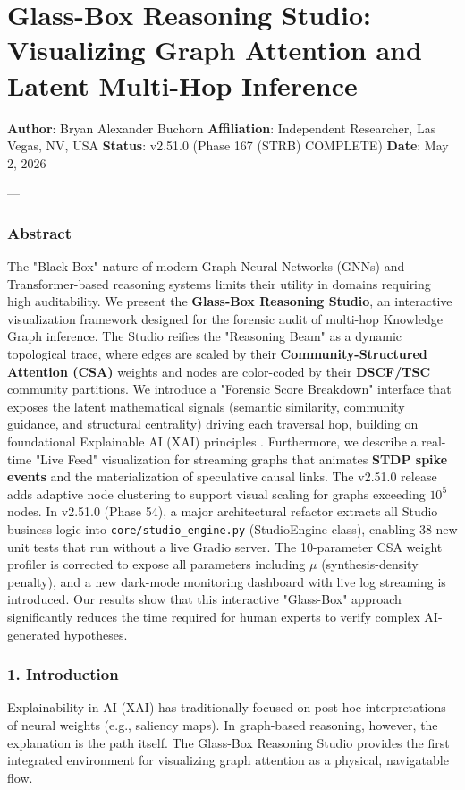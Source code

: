\section{Glass-Box Reasoning Studio: Visualizing Graph Attention and Latent Multi-Hop Inference}

\textbf{Author}: Bryan Alexander Buchorn  
\textbf{Affiliation}: Independent Researcher, Las Vegas, NV, USA  
\textbf{Status}: v2.51.0 (Phase 167 (STRB) COMPLETE)
\textbf{Date}: May 2, 2026

---

\subsubsection{Abstract}
The "Black-Box" nature of modern Graph Neural Networks (GNNs) and Transformer-based reasoning systems limits their utility in domains requiring high audit\-ability. We present the \textbf{Glass-Box Reasoning Studio}, an interactive visua\-lization framework designed for the forensic audit of multi-hop Knowledge Graph inference. The Studio reifies the "Reasoning Beam" as a dynamic topological trace, where edges are scaled by their \textbf{Community-Structured Attention (CSA)} weights and nodes are color-coded by their \textbf{DSCF/TSC} community partitions. We introduce a "Forensic Score Breakdown" interface that exposes the latent mathe\-matical signals (semantic similarity, community guidance, and structural centrality) driving each traversal hop, building on found\-ational Explainable AI (XAI) principles \cite{samek2017explainable, ribeiro2016lime, lundberg2017shap}. Furthermore, we describe a real-time "Live Feed" visua\-lization for streaming graphs that animates \textbf{STDP spike events} and the mater\-ialization of speculative causal links. The v2.51.0 release adds adaptive node clustering to support visual scaling for graphs exceeding $10^5$ nodes. In v2.51.0 (Phase 54), a major archi\-tectural refactor extracts all Studio business logic into \texttt{core/studio\_engine.py} (StudioEngine class), enabling 38 new unit tests that run without a live Gradio server. The 10-parameter CSA weight profiler is corrected to expose all parameters including $\mu$ (synthesis-density penalty), and a new dark-mode monitoring dashboard with live log streaming is introduced. Our results show that this interactive "Glass-Box" approach signi\-ficantly reduces the time required for human experts to verify complex AI-generated hypotheses.

\subsubsection{1. Introd\-uction}
Explai\-nability in AI (XAI) has tradi\-tionally focused on post-hoc inter\-pretations of neural weights (e.g., saliency maps). In graph-based reasoning, however, the explanation is the path itself. The Glass-Box Reasoning Studio provides the first integrated environment for visualizing graph attention as a physical, navigatable flow.

